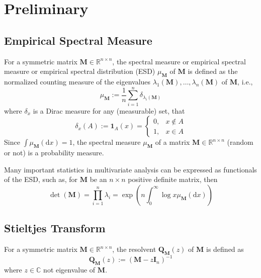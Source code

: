 \chapter{Preliminary}

\section{Empirical Spectral Measure}

\begin{definition}
	For a symmetric matrix $\mathbf{M}\in\mathbb{R}^{n\times n}$, the spectral measure or empirical spectral measure or empirical spectral distribution (ESD) $\mu_{\mathbf{M}}$ of $\mathbf{M}$ is defined as the normalized counting measure of the eigenvalues $\lambda_{1}(\mathbf{M}),\ldots,\lambda_{n}(\mathbf{M})$ of $\mathbf{M}$, i.e.,
	\begin{equation}
		\mu_{\mathbf{M}}:=\frac{1}{n}\sum_{i=1}^{n}\delta_{\lambda_{i}(\mathbf{M})}
	\end{equation}
	where $\delta_{x}$ is a Dirac measure for any (measurable) set, that
	\begin{equation*}
		\delta_{x}(A):=\mathbf{1}_{A}(x)=
		\begin{cases}
			0, & x\notin A \\
			1, & x\in A
		\end{cases}
	\end{equation*}
	Since $\int\mu_{\mathbf{M}}\left(\mathrm{d}x\right)=1$, the spectral measure $\mu_{\mathbf{M}}$ of a matrix $\mathbf{M}\in\mathbb{R}^{n\times n}$ (random or not) is a probability measure.
\end{definition}

\begin{remark}
	Many important statistics in multivariate analysis can be expressed as functionals of the ESD, such as, for $\mathbf{M}$ be an $n\times n$ positive definite matrix, then
	\begin{equation}
		\operatorname{det}(\mathbf{M})=\prod_{i=1}^{n}\lambda_{i}=\exp\left(n\int_{0}^{\infty}\log x\mu_{\mathbf{M}}(\mathrm{d}x)\right)
	\end{equation}
\end{remark}

\section{Stieltjes Transform}

\begin{definition}[Resolvent]
	For a symmetric matrix $\mathbf{M}\in\mathbb{R}^{n\times n}$, the resolvent $\mathbf{Q}_{\mathbf{M}}(z)$ of $\mathbf{M}$ is defined as
	\begin{equation}
		\mathbf{Q}_{\mathbf{M}}(z):=\left(\mathbf{M}-z\mathbf{I}_{n}\right)^{-1}
	\end{equation}
	where $z\in\mathbb{C}$ not eigenvalue of $\mathbf{M}$.
\end{definition}

